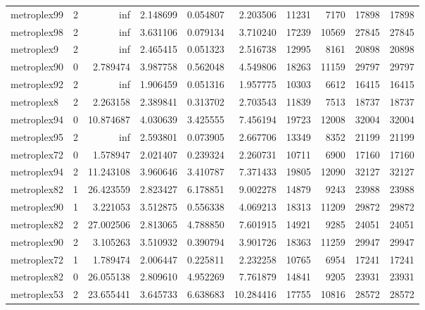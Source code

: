 \begin{longtable}{|l|r|r|r|r|r|r|r|r|r|}
metroplex99 & 2 & inf & 2.148699 & 0.054807 & 2.203506 & 11231 & 7170 & 17898 & 17898 \\
metroplex98 & 2 & inf & 3.631106 & 0.079134 & 3.710240 & 17239 & 10569 & 27845 & 27845 \\
metroplex9 & 2 & inf & 2.465415 & 0.051323 & 2.516738 & 12995 & 8161 & 20898 & 20898 \\
metroplex90 & 0 & 2.789474 & 3.987758 & 0.562048 & 4.549806 & 18263 & 11159 & 29797 & 29797 \\
metroplex92 & 2 & inf & 1.906459 & 0.051316 & 1.957775 & 10303 & 6612 & 16415 & 16415 \\
metroplex8 & 2 & 2.263158 & 2.389841 & 0.313702 & 2.703543 & 11839 & 7513 & 18737 & 18737 \\
metroplex94 & 0 & 10.874687 & 4.030639 & 3.425555 & 7.456194 & 19723 & 12008 & 32004 & 32004 \\
metroplex95 & 2 & inf & 2.593801 & 0.073905 & 2.667706 & 13349 & 8352 & 21199 & 21199 \\
metroplex72 & 0 & 1.578947 & 2.021407 & 0.239324 & 2.260731 & 10711 & 6900 & 17160 & 17160 \\
metroplex94 & 2 & 11.243108 & 3.960646 & 3.410787 & 7.371433 & 19805 & 12090 & 32127 & 32127 \\
metroplex82 & 1 & 26.423559 & 2.823427 & 6.178851 & 9.002278 & 14879 & 9243 & 23988 & 23988 \\
metroplex90 & 1 & 3.221053 & 3.512875 & 0.556338 & 4.069213 & 18313 & 11209 & 29872 & 29872 \\
metroplex82 & 2 & 27.002506 & 2.813065 & 4.788850 & 7.601915 & 14921 & 9285 & 24051 & 24051 \\
metroplex90 & 2 & 3.105263 & 3.510932 & 0.390794 & 3.901726 & 18363 & 11259 & 29947 & 29947 \\
metroplex72 & 1 & 1.789474 & 2.006447 & 0.225811 & 2.232258 & 10765 & 6954 & 17241 & 17241 \\
metroplex82 & 0 & 26.055138 & 2.809610 & 4.952269 & 7.761879 & 14841 & 9205 & 23931 & 23931 \\
metroplex53 & 2 & 23.655441 & 3.645733 & 6.638683 & 10.284416 & 17755 & 10816 & 28572 & 28572 \\
\end{longtable}
